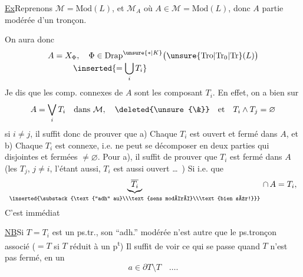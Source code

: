 \uline{Ex}\qquad Reprenons $\mathcal M=\mathrm{Mod}(L)$, et $\mathcal M_A$ où $A\in \mathcal M=\mathrm{Mod}(L)$, donc $A$ partie modérée d'un tronçon.

On aura donc
\[
\begin{aligned}
A=X_{\Phi} &,\quad
\Phi\in{\operatorname{Drap}}^{\unsure{*|K}}
  \bigl(\unsure{\mathrm{Tro}|\mathrm{Tr}_0|\mathrm{Tr}}(L)\bigr)\\[-0.6ex]
 &\mkern-8mu\inserted{=\bigcup_i T_i}
\end{aligned}
\]
Je dis que les comp. connexes de $A$ sont les  composant $T_i$.
En effet, on a bien sur
\[
A=\bigvee_i T_i\quad\text{dans }\mathcal M,\quad\deleted{\unsure{\&}}\quad\text{et}\quad T_i\wedge T_j=\varnothing
\]
si $i\ne j$, il suffit donc de prouver que a) Chaque $T_i$ est ouvert et fermé dans $A$, et b) Chaque $T_i$ est connexe, i.e. ne peut se décomposer en deux parties qui  disjointes et  fermées $\ne\varnothing$.
Pour a), il suffit de prouver que $T_i$ est fermé dans  $A$ (les $T_j$, $j\ne i$, l'étant aussi, $T_i$ est aussi ouvert \ldots\ ) Si  i.e. que
\[
\underbrace{\overline{T_i}}_{\inserted{\substack{\text{``adh'' au}\\\text{sens modéré}\\\text{bien sûr!}}}}\,\cap\, A=T_{i},
\]
C'est immédiat

\uline{NB}\qquad Si $T=T_i$ est un ps.tr., son ``adh.'' modérée n'est autre que le ps.tronçon  associé ($=T$ si $T$ réduit à un p\textsuperscript{t}) Il suffit de voir ce qui se passe quand $T$ n'est pas fermé, en un   
\[
a\in\partial T\setminus T\quad\ldots.
\]

